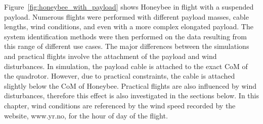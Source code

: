             Figure~\ref{fig:honeybee_with_payload} shows Honeybee in flight with a suspended payload.
            Numerous flights were performed with different 
            payload masses, 
            cable lengths, 
            wind conditions, 
            and even with a more complex elongated payload.
            The system identification methods were then performed on the data resulting from this range of different use cases.
            The major differences between the simulations and practical flights involve the attachment of the payload and wind disturbances.
            In simulation, the payload cable is attached to the exact CoM of the quadrotor.
            However, due to practical constraints, the cable is attached slightly below the CoM of Honeybee.
            Practical flights are also influenced by wind disturbances, therefore this effect is also investigated in the sections below.
            In this chapter, wind conditions are referenced by the wind speed recorded by the website, www.yr.no, 
            for the hour of day of the flight.
            

        
